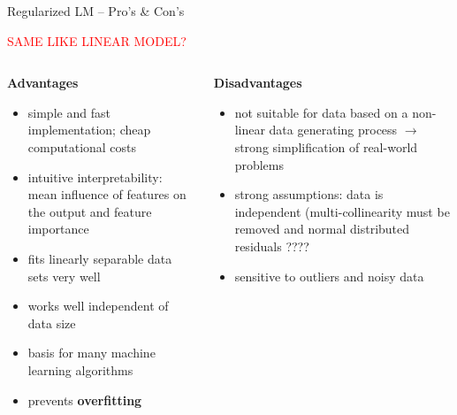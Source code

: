 \documentclass[11pt,compress,t,notes=noshow, xcolor=table]{beamer}
\newcommand{\highlight}[1]{\textcolor{highlightcol}{\textbf{#1}}}
\newcommand{\positem}{\item[$\highlight{+}$]}
\newcommand{\negitem}{\item[$\highlight{-}$]}
\newcommand{\conclbox}[1]{\fbox{\parbox{\textwidth}{\centering\textbf{#1}}}}
\begin{document}

\begin{frame}{Regularized LM -- Pro's \& Con's}

\footnotesize

\textcolor{red}{SAME LIKE LINEAR MODEL?}

\begin{columns}[onlytextwidth]
  \begin{column}{0.5\textwidth}
    \highlight{Advantages}
    \footnotesize
    \begin{itemize}
      \positem simple and fast implementation; cheap computational costs
      \positem intuitive interpretability: mean influence of features on the output and feature importance
      \positem fits linearly separable data sets very well
      \positem works well independent of data size
      \positem basis for many machine learning algorithms
      \positem prevents \textbf{overfitting}

    \end{itemize}
  \end{column}

  \begin{column}{0.5\textwidth}
    \highlight{Disadvantages}
    \footnotesize
    \begin{itemize}
      \negitem not suitable for data based on a non-linear data generating process $\rightarrow$ strong simplification of real-world problems

      \negitem strong assumptions: data is independent (multi-collinearity must be removed and normal distributed residuals ????

      \negitem sensitive to outliers and noisy data
    \end{itemize}
  \end{column}
\end{columns}

\vfill

\small

\conclbox{\textcolor{red}{Simple method with good interpretability for linear problems, but strong assumptions and simplification of real-world problems.}}

\end{frame}

\end{document}
